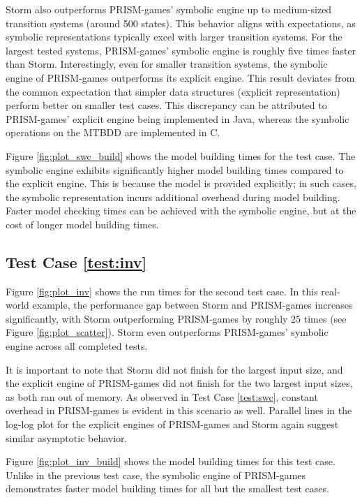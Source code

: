 Storm also outperforms PRISM-games' symbolic engine up to medium-sized transition systems (around 500 states). This behavior aligns with expectations, as symbolic representations typically excel with larger transition systems. For the largest tested systems, PRISM-games' symbolic engine is roughly five times faster than Storm. Interestingly, even for smaller transition systems, the symbolic engine of PRISM-games outperforms its explicit engine. This result deviates from the common expectation that simpler data structures (explicit representation) perform better on smaller test cases. This discrepancy can be attributed to PRISM-games' explicit engine being implemented in Java, whereas the symbolic operations on the MTBDD are implemented in C.



Figure \ref{fig:plot_swc_build} shows the model building times for the test case. The symbolic engine exhibits significantly higher model building times compared to the explicit engine. This is because the model is provided explicitly; in such cases, the symbolic representation incurs additional overhead during model building. Faster model checking times can be achieved with the symbolic engine, but at the cost of longer model building times.

\subsection{Test Case \ref{test:inv}}


Figure \ref{fig:plot_inv} shows the run times for the second test case. In this real-world example, the performance gap between Storm and PRISM-games increases significantly, with Storm outperforming PRISM-games by roughly 25 times (see Figure \ref{fig:plot_scatter}). Storm even outperforms PRISM-games' symbolic engine across all completed tests.

It is important to note that Storm did not finish for the largest input size, and the explicit engine of PRISM-games did not finish for the two largest input sizes, as both ran out of memory. As observed in Test Case \ref{test:swc}, constant overhead in PRISM-games is evident in this scenario as well. Parallel lines in the log-log plot for the explicit engines of PRISM-games and Storm again suggest similar asymptotic behavior.



Figure \ref{fig:plot_inv_build} shows the model building times for this test case. Unlike in the previous test case, the symbolic engine of PRISM-games demonstrates faster model building times for all but the smallest test cases.

